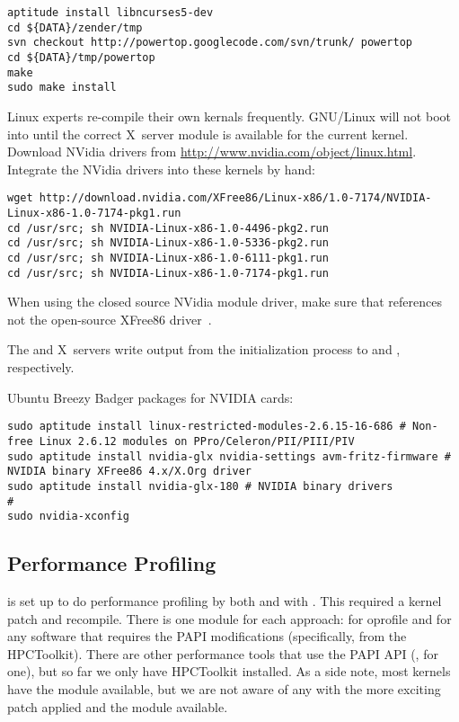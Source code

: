 \documentclass[12pt,twoside]{article}
\begin{document}
\begin{verbatim}
aptitude install libncurses5-dev
cd ${DATA}/zender/tmp
svn checkout http://powertop.googlecode.com/svn/trunk/ powertop
cd ${DATA}/tmp/powertop
make
sudo make install
\end{verbatim}

Linux experts re-compile their own kernals frequently.
GNU/Linux will not boot into  until the correct X~server
module is available for the current kernel.
Download NVidia drivers from
\url{http://www.nvidia.com/object/linux.html}. 
Integrate the NVidia drivers into these kernels by hand:
\begin{verbatim}
wget http://download.nvidia.com/XFree86/Linux-x86/1.0-7174/NVIDIA-Linux-x86-1.0-7174-pkg1.run
cd /usr/src; sh NVIDIA-Linux-x86-1.0-4496-pkg2.run
cd /usr/src; sh NVIDIA-Linux-x86-1.0-5336-pkg2.run
cd /usr/src; sh NVIDIA-Linux-x86-1.0-6111-pkg1.run
cd /usr/src; sh NVIDIA-Linux-x86-1.0-7174-pkg1.run
\end{verbatim}
When using the closed source NVidia module driver, make sure that
 references  not the open-source
XFree86 driver~.

The  and  X~servers write output from
the initialization process to  and
, respectively.

Ubuntu Breezy Badger packages for NVIDIA cards:
\begin{verbatim}
sudo aptitude install linux-restricted-modules-2.6.15-16-686 # Non-free Linux 2.6.12 modules on PPro/Celeron/PII/PIII/PIV
sudo aptitude install nvidia-glx nvidia-settings avm-fritz-firmware # NVIDIA binary XFree86 4.x/X.Org driver
sudo aptitude install nvidia-glx-180 # NVIDIA binary drivers
# 
sudo nvidia-xconfig
\end{verbatim}

\subsection{Performance Profiling}\label{sxn:prf}\label{sxn:oprofile}

 is set up to do performance profiling by both
 and  with .  
This required a kernel patch and recompile.  
There is one module for each approach:
 for oprofile and  for any software
that requires the PAPI modifications (specifically, 
from the HPCToolkit).
There are other performance tools that use the PAPI API (, 
for one), but so far we only have HPCToolkit installed. 
As a side note, most  kernels have the
 module available, but we are not aware of any with
the more exciting  patch applied and the
 module available.  
\end{document}
